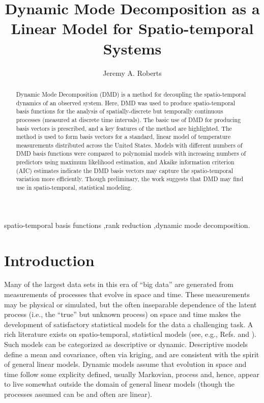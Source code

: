 \documentclass[review,number,sort&compress,12pt]{elsarticle}
\begin{document}
\begin{frontmatter}

\title{Dynamic Mode Decomposition as a Linear Model for Spatio-temporal Systems}

\author{Jeremy A. Roberts}
\address{Department of Statistics, Kansas State University, Manhattan, KS 66506, USA}

\begin{abstract}
Dynamic Mode Decomposition (DMD) is a method for decoupling the spatio-temporal dynamics of an observed system.
Here, DMD was used to produce spatio-temporal basis functions for the analysis of spatially-discrete but temporally
continuous processes (measured at discrete time intervals).
The basic use of DMD for producing basis vectors is prescribed, and a key features of the method are highlighted.
The method is used to form basis vectors for a standard, linear model of temperature measurements distributed across the United States.
Models with different numbers of DMD basis functions were compared to polynomial models with increasing numbers of predictors using maximum likelihood estimation, and Akaike information criterion (AIC) estimates indicate the DMD basis vectors may capture the spatio-temporal variation more efficiently.
Though preliminary, the work suggests that DMD may find use in spatio-temporal, statistical modeling.
\end{abstract}

\begin{keyword}
 spatio-temporal basis functions \sep rank reduction \sep dynamic mode decomposition.
\end{keyword}
\end{frontmatter}

\ifDRAFT
\linenumbers
\fi

\section{Introduction}
\label{sec:introduction}

Many of the largest data sets in this era of ``big data'' are generated from measurements of processes that evolve in space and time.
These measurements may be physical or simulated, but the often inseparable dependence of the latent process (i.e., the ``true'' but unknown process) on space and time makes the development of satisfactory statistical models for the data a challenging task.
A rich literature exists on spatio-temporal, statistical models (see, e.g., Refs. \cite{cressie2011sst} and \cite{wikle2019sts}).
Such models can be categorized as descriptive or dynamic.  
Descriptive models define a mean and covariance, often via kriging, and are consistent with the spirit of general linear models.  
Dynamic models assume that evolution in space and time follow some explicity defined, usually Markovian, process and, hence, appear to live somewhat outside the domain of general linear models (though the processes assumed can be and often are linear).
\end{document}
